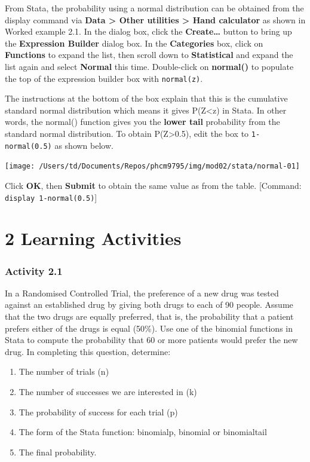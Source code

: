 \documentclass[
]{memoir}
\providecommand{\tightlist}{%
  \setlength{\itemsep}{0pt}\setlength{\parskip}{0pt}}
\begin{document}
From Stata, the probability using a normal distribution can be obtained from the display command via \textbf{Data \textgreater{} Other utilities \textgreater{} Hand calculator} as shown in Worked example 2.1. In the dialog box, click the \textbf{Create\ldots{}} button to bring up the \textbf{Expression Builder} dialog box. In the \textbf{Categories} box, click on \textbf{Functions} to expand the list, then scroll down to \textbf{Statistical} and expand the list again and select \textbf{Normal} this time. Double-click on \textbf{normal()} to populate the top of the expression builder box with \texttt{normal(z)}.

The instructions at the bottom of the box explain that this is the cumulative standard normal distribution which means it gives P(Z\textless z) in Stata. In other words, the normal() function gives you the \textbf{lower tail} probability from the standard normal distribution. To obtain P(Z\textgreater0.5), edit the box to \texttt{1-normal(0.5)} as shown below.

\texttt{[image: /Users/td/Documents/Repos/phcm9795/img/mod02/stata/normal-01]}

Click \textbf{OK}, then \textbf{Submit} to obtain the same value as from the table. {[}Command: \texttt{display\ 1-normal(0.5)}{]}

\hypertarget{learning-activities-1}{%
\chapter*{\texorpdfstring{\textbf{2} Learning Activities}{2 Learning Activities}}\label{learning-activities-1}}

\hypertarget{activity-2.1}{%
\subsection*{Activity 2.1}\label{activity-2.1}}

In a Randomised Controlled Trial, the preference of a new drug was tested against an established drug by giving both drugs to each of 90 people. Assume that the two drugs are equally preferred, that is, the probability that a patient prefers either of the drugs is equal (50\%). Use one of the binomial functions in Stata to compute the probability that 60 or more patients would prefer the new drug. In completing this question, determine:

\begin{enumerate}
\def\labelenumi{\alph{enumi})}
\tightlist
\item
  The number of trials (n)
\item
  The number of successes we are interested in (k)
\item
  The probability of success for each trial (p)
\item
  The form of the Stata function: binomialp, binomial or binomialtail
\item
  The final probability.
\end{enumerate}
\end{document}
